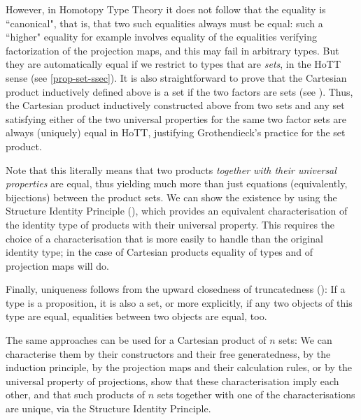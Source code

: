 \documentclass{amsart}
\theoremstyle{plain}
\numberwithin{equation}{section} %
\numberwithin{figure}{section} %
\theoremstyle{plain}
\theoremstyle{plain}
\theoremstyle{plain}
\theoremstyle{plain}
\theoremstyle{plain}
\theoremstyle{plain}
\theoremstyle{remark}
\theoremstyle{remark}
\theoremstyle{remark}
\begin{document}
However, in Homotopy Type Theory it does not follow that the equality is ``canonical", that is, that two such equalities always must be equal: such a ``higher" equality for example involves equality of the equalities verifying factorization of the projection maps, and this may fail in arbitrary types. But they are automatically equal if  we restrict to types that are \textit{sets}, in the HoTT sense (see \ref{prop-set-ssec}). It is also straightforward to prove that the Cartesian product inductively defined above is a set if the two factors are sets (see \cite[2.6]{HoTTBook}). 
Thus, the Cartesian product inductively constructed above from two sets and any set satisfying either of the two universal properties for the same two factor sets are always (uniquely) equal in HoTT, justifying Grothendieck's practice for the set product. 

Note that this literally means that two products \textit{together with their universal properties} are equal, thus yielding much more than just equations (equivalently, bijections) between the product sets. We can show the existence by using the Structure Identity Principle (\cite[11.6]{Rij22}), which provides an equivalent  characterisation of the identity type of products with their universal property. This requires the choice of a characterisation that is more easily to handle than the original identity type; in the case of Cartesian products equality of types and of projection maps will do.

Finally, uniqueness follows from the upward closedness of truncatedness (\cite[Prop.12.4.3]{Rij22}): If a type is a proposition, it is also a set, or more explicitly, if any two objects of this type are equal, equalities between two objects are equal, too.

The same approaches can be used for a Cartesian product of $n$ sets: We can characterise them by their constructors and their free generatedness, by the induction principle, by the projection maps and their calculation rules, or by the universal property of projections, show that these characterisation imply each other, and that such products of $n$ sets together with one of the characterisations are unique,
via the Structure Identity Principle. 
\end{document}
